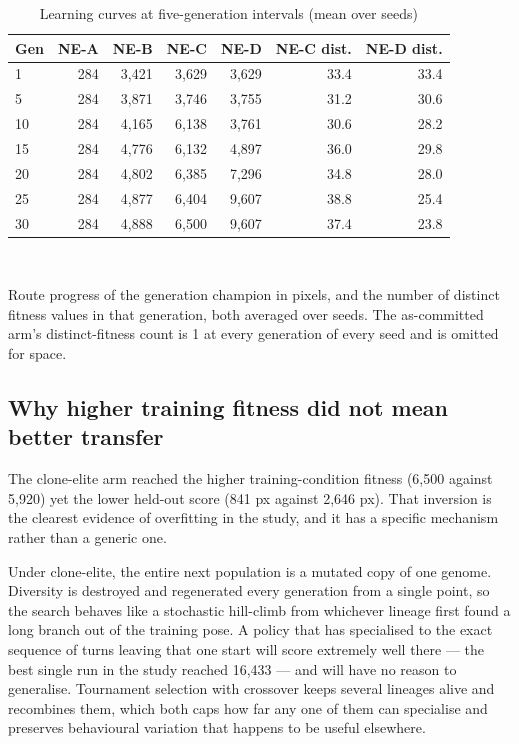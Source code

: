 \documentclass[conference]{IEEEtran}
\begin{document}
\begin{table}[!t]
\caption{Learning curves at five-generation intervals (mean over seeds)}
\label{tab:curve}
\centering
\footnotesize
\begin{tabular}{lrrrrrr}
\toprule
Gen & NE-A & NE-B & NE-C & NE-D & NE-C dist. & NE-D dist. \\
\midrule
1 & 284 & 3,421 & 3,629 & 3,629 & 33.4 & 33.4 \\
5 & 284 & 3,871 & 3,746 & 3,755 & 31.2 & 30.6 \\
10 & 284 & 4,165 & 6,138 & 3,761 & 30.6 & 28.2 \\
15 & 284 & 4,776 & 6,132 & 4,897 & 36.0 & 29.8 \\
20 & 284 & 4,802 & 6,385 & 7,296 & 34.8 & 28.0 \\
25 & 284 & 4,877 & 6,404 & 9,607 & 38.8 & 25.4 \\
30 & 284 & 4,888 & 6,500 & 9,607 & 37.4 & 23.8 \\
\bottomrule
\end{tabular}
\\[2pt]\parbox{\linewidth}{\scriptsize Route progress of the generation champion in pixels, and the number of distinct fitness values in that generation, both averaged over seeds. The as-committed arm's distinct-fitness count is 1 at every generation of every seed and is omitted for space.}
\end{table}

\subsection{Why higher training fitness did not mean better transfer}

The clone-elite arm reached the higher training-condition fitness (6,500 against 5,920) yet the lower held-out score (841 px against 2,646 px). That inversion is the clearest evidence of overfitting in the study, and it has a specific mechanism rather than a generic one.

Under clone-elite, the entire next population is a mutated copy of one genome. Diversity is destroyed and regenerated every generation from a single point, so the search behaves like a stochastic hill-climb from whichever lineage first found a long branch out of the training pose. A policy that has specialised to the exact sequence of turns leaving that one start will score extremely well there — the best single run in the study reached 16,433 — and will have no reason to generalise. Tournament selection with crossover keeps several lineages alive and recombines them, which both caps how far any one of them can specialise and preserves behavioural variation that happens to be useful elsewhere.
\end{document}
